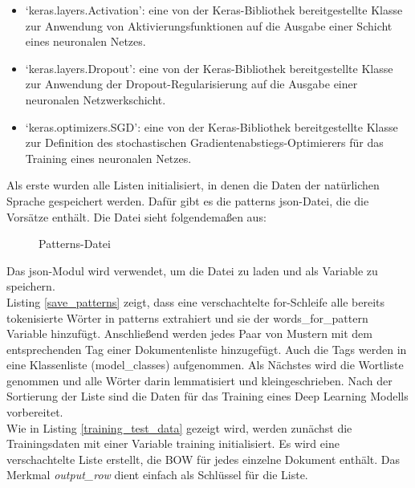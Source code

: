 \begin{itemize}
    \item `keras.layers.Activation': eine von der Keras-Bibliothek bereitgestellte Klasse zur Anwendung von Aktivierungsfunktionen auf die Ausgabe einer Schicht eines neuronalen Netzes.
    \item `keras.layers.Dropout': eine von der Keras-Bibliothek bereitgestellte Klasse zur Anwendung der Dropout-Regularisierung auf die Ausgabe einer neuronalen Netzwerkschicht.
    \item `keras.optimizers.SGD': eine von der Keras-Bibliothek bereitgestellte Klasse zur Definition des stochastischen Gradientenabstiegs-Optimierers für das Training eines neuronalen Netzes.
\end{itemize}
Als erste wurden alle Listen initialisiert, in denen die Daten der natürlichen Sprache gespeichert werden. 
Dafür gibt es die \glqq{}patterns\grqq{} json-Datei, die die \glqq{}Vorsätze\grqq{} enthält. Die Datei sieht folgendemaßen aus:
\begin{figure}[H]
    \centering
    \caption{\label{figure:Json_Patterns}Patterns-Datei}
\end{figure}
\noindent
Das json-Modul wird verwendet, um die Datei zu laden und als Variable zu speichern.\\

Listing \ref{save_patterns} zeigt, dass eine verschachtelte for-Schleife alle bereits tokenisierte Wörter in \glqq{}patterns\grqq{} extrahiert und sie der \glqq{}words\_for\_pattern\grqq{} Variable hinzufügt.
Anschließend werden jedes Paar von Mustern mit dem entsprechenden Tag einer Dokumentenliste hinzugefügt. 
Auch die Tags werden in eine Klassenliste (\glqq{}model\_classes\grqq{}) aufgenommen.
Als Nächstes wird die Wortliste genommen und alle Wörter darin lemmatisiert und kleingeschrieben. 
Nach der Sortierung der Liste sind die Daten für das Training eines Deep Learning Modells vorbereitet.\\

Wie in Listing \ref{training_test_data} gezeigt wird, werden zunächst die Trainingsdaten mit einer Variable \glqq{}training\grqq{} initialisiert. 
Es wird eine verschachtelte Liste erstellt, die \ac{BOW} für jedes einzelne Dokument enthält. 
Das Merkmal \textit{output\_row} dient einfach als Schlüssel für die Liste. 

